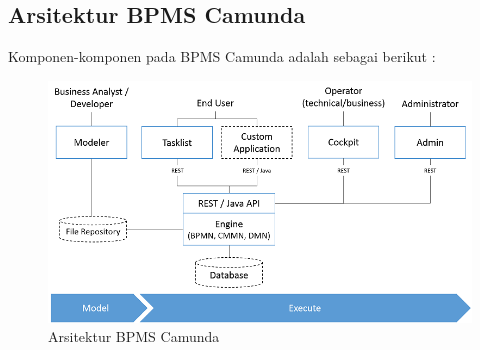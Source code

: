 \subsection{Arsitektur BPMS Camunda}
Komponen-komponen pada BPMS Camunda adalah sebagai berikut :
\begin{figure}[H]
	\centering
	\includegraphics[scale=0.5]{Gambar/Bab-2/bpms/arsitektur-camunda}
	\caption{Arsitektur BPMS Camunda} 
	\label{fig:arsitekturcamunda}
\end{figure}

